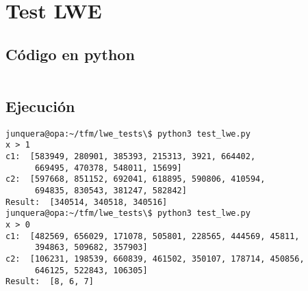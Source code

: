 \chapter{Test LWE}
\label{appendix:test_lwe}

\section{Código en python}

\inputminted{python}{apendices/test_lwe.py}

\section{Ejecución}

\begin{verbatim}
junquera@opa:~/tfm/lwe_tests\$ python3 test_lwe.py
x > 1
c1:  [583949, 280901, 385393, 215313, 3921, 664402,
      669495, 470378, 548011, 15699]
c2:  [597668, 851152, 692041, 618895, 590806, 410594,
      694835, 830543, 381247, 582842]
Result:  [340514, 340518, 340516]
junquera@opa:~/tfm/lwe_tests\$ python3 test_lwe.py
x > 0
c1:  [482569, 656029, 171078, 505801, 228565, 444569, 45811,
      394863, 509682, 357903]
c2:  [106231, 198539, 660839, 461502, 350107, 178714, 450856,
      646125, 522843, 106305]
Result:  [8, 6, 7]
\end{verbatim}
